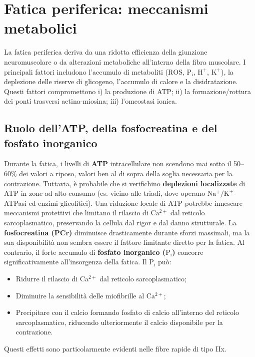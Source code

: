 \documentclass[12pt,a4paper]{report}
\begin{document}
\section{Fatica periferica: meccanismi metabolici}
La fatica periferica deriva da una ridotta efficienza della giunzione neuromuscolare o da alterazioni metaboliche all'interno della fibra muscolare. I principali fattori includono l'accumulo di metaboliti (\(\mathrm{ROS}\), \(\mathrm{P_i}\), \(\mathrm{H^+}\), \(\mathrm{K^+}\)), la deplezione delle riserve di glicogeno, l'accumulo di calore e la disidratazione. Questi fattori compromettono i) la produzione di ATP; ii) la formazione/rottura dei ponti trasversi actina-miosina; iii) l'omeostasi ionica.

\subsection{Ruolo dell'ATP, della fosfocreatina e del fosfato inorganico}
Durante la fatica, i livelli di \textbf{ATP} intracellulare non scendono mai sotto il 50--60\% dei valori a riposo, valori ben al di sopra della soglia necessaria per la contrazione. Tuttavia, è probabile che si verifichino \textbf{deplezioni localizzate} di ATP in zone ad alto consumo (es. vicino alle triadi, dove operano \(\mathrm{Na^+/K^+}\)-ATPasi ed enzimi glicolitici). Una riduzione locale di ATP potrebbe innescare meccanismi protettivi che limitano il rilascio di \(\mathrm{Ca^{2+}}\) dal reticolo sarcoplasmatico, preservando la cellula dal rigor e dal danno strutturale.
La \textbf{fosfocreatina (PCr)} diminuisce drasticamente durante sforzi massimali, ma la sua disponibilità non sembra essere il fattore limitante diretto per la fatica. Al contrario, il forte accumulo di \textbf{fosfato inorganico (\(\mathrm{P_i}\))} concorre significativamente all'insorgenza della fatica. Il \(\mathrm{P_i}\) può:
\begin{itemize}
\item Ridurre il rilascio di \(\mathrm{Ca^{2+}}\) dal reticolo sarcoplasmatico;
\item Diminuire la sensibilità delle miofibrille al \(\mathrm{Ca^{2+}}\);
\item Precipitare con il calcio formando fosfato di calcio all'interno del reticolo sarcoplasmatico, riducendo ulteriormente il calcio disponibile per la contrazione.
\end{itemize}
Questi effetti sono particolarmente evidenti nelle fibre rapide di tipo IIx.
\end{document}
